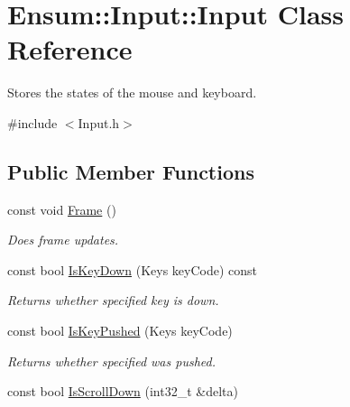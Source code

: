 \hypertarget{class_ensum_1_1_input_1_1_input}{}\section{Ensum\+:\+:Input\+:\+:Input Class Reference}
\label{class_ensum_1_1_input_1_1_input}


Stores the states of the mouse and keyboard.  




{\ttfamily \#include $<$Input.\+h$>$}

\subsection*{Public Member Functions}
\begin{DoxyCompactItemize}
\item 
const void \hyperlink{class_ensum_1_1_input_1_1_input_aade076509ba0a3b50a5f60b0fbeedf3b}{Frame} ()
\begin{DoxyCompactList}\small\item\em Does frame updates. \end{DoxyCompactList}\item 
const bool \hyperlink{class_ensum_1_1_input_1_1_input_a5770ec02144e58c2cc56df1ff3c97815}{Is\+Key\+Down} (Keys key\+Code) const \hypertarget{class_ensum_1_1_input_1_1_input_a5770ec02144e58c2cc56df1ff3c97815}{}\label{class_ensum_1_1_input_1_1_input_a5770ec02144e58c2cc56df1ff3c97815}

\begin{DoxyCompactList}\small\item\em Returns whether specified key is down. \end{DoxyCompactList}\item 
const bool \hyperlink{class_ensum_1_1_input_1_1_input_a5606f37cdd00048e85f71f5b2ab7324e}{Is\+Key\+Pushed} (Keys key\+Code)\hypertarget{class_ensum_1_1_input_1_1_input_a5606f37cdd00048e85f71f5b2ab7324e}{}\label{class_ensum_1_1_input_1_1_input_a5606f37cdd00048e85f71f5b2ab7324e}

\begin{DoxyCompactList}\small\item\em Returns whether specified was pushed. \end{DoxyCompactList}\item 
const bool \hyperlink{class_ensum_1_1_input_1_1_input_a33b4028b427092473507a6c704259456}{Is\+Scroll\+Down} (int32\+\_\+t \&delta)\hypertarget{class_ensum_1_1_input_1_1_input_a33b4028b427092473507a6c704259456}{}\label{class_ensum_1_1_input_1_1_input_a33b4028b427092473507a6c704259456}


\end{DoxyCompactItemize}
